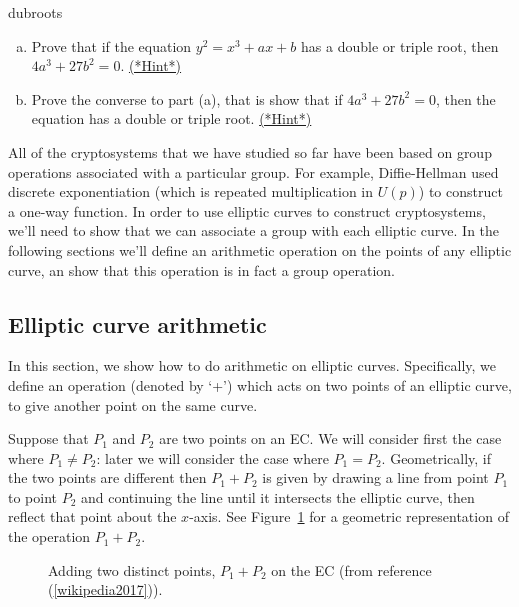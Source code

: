 \begin{exercise}{dubroots}
		\begin{enumerate}[(a)] 
	\item  Prove that if the equation $y^2 = x^3 + ax + b$ has a double or triple root, then $4a^3+27b^2=0$. 
\hyperref[sec:further_crypt:hints]{(*Hint*)}
	\item Prove the converse to part (a), that is show that if $4a^3 + 27b ^2=0$, then the equation has a double or triple root. \hyperref[sec:further_crypt:hints]{(*Hint*)}
\end {enumerate} 
\end{exercise}

All of the cryptosystems that we have studied so far have been based on group operations associated with a particular group. For example, Diffie-Hellman used discrete exponentiation (which is repeated multiplication in $U(p)$) to construct a one-way function. In order to  use elliptic curves to construct cryptosystems, we'll need to show that we can associate a group with each elliptic curve. In the following sections we'll define an arithmetic operation on the points of  any  elliptic curve, an  show that this operation is in fact a group operation.

\subsection{Elliptic curve arithmetic}\label{sec:ECA}
In this section, we show how to do arithmetic on elliptic curves. Specifically, we define an operation (denoted by `+') which acts on two points of an elliptic curve, to give another point on the same curve. 

Suppose that $P_1$ and $P_2$ are two points on an EC. We will consider first the case where $P_1 \neq P_2$: later we will consider the case where  $P_1= P_2$. Geometrically, if the two points are different then $P_1 + P_2$ is given by drawing a line from point $P_1$ to point $P_2$ and continuing the line until it intersects the elliptic curve, then reflect that point about the $x$-axis.  See Figure~\ref{fig:DH:DHKE_6} for a geometric representation of the operation $P_1+P_2$.

\begin{figure}[htbp]
	  \caption{\label{fig:DH:DHKE_6}Adding two distinct points, $P_1 + P_2$ on the EC (from reference (\ref{wikipedia2017})).}
\end{figure}

